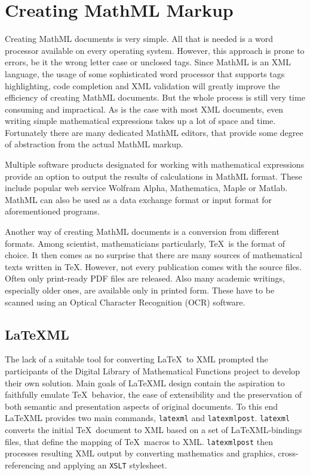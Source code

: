 \documentclass[11pt,oneside,final]{fithesis2}
\begin{document}
\section{Creating MathML Markup}
\label{sec:create-mathml}
Creating MathML documents is very simple. All that is needed is a word processor available on every operating system. However, this approach is prone to errors, be it the wrong letter case or unclosed tags. Since MathML is an XML language, the usage of some sophisticated word processor that supports tags highlighting, code completion and XML validation will greatly improve the efficiency of creating MathML documents. But the whole process is still very time consuming and impractical. As is the case with most XML documents, even writing simple mathematical expressions takes up a lot of space and time. Fortunately there are many dedicated MathML editors, that provide some degree of abstraction from the actual MathML markup.

Multiple software products designated for working with mathematical expressions provide an option to output the results of calculations in MathML format. These include popular web service Wolfram Alpha, Mathematica, Maple or Matlab. MathML can also be used as a data exchange format or input format for aforementioned programs.

Another way of creating MathML documents is a conversion from different formats. Among scientist, mathematicians particularly, \TeX\ is the format of choice. It then comes as no surprise that there are many sources of mathematical texts written in \TeX. However, not every publication comes with the source files. Often only print-ready PDF files are released\cite{baker2011towards}. Also many academic writings, especially older ones, are available only in printed form. These have to be scanned using an Optical Character Recognition (OCR) software. 

\subsection{\LaTeX ML}
The lack of a suitable tool for converting \LaTeX\ to XML prompted the participants of the Digital Library of Mathematical Functions project to develop their own solution. Main goals of \LaTeX ML\cite{latexml:miller2013} design contain the aspiration to faithfully emulate \TeX\ behavior, the ease of extensibility and the preservation of both semantic and presentation aspects of original documents. To this end \LaTeX ML provides two main commands, \texttt{latexml} and \texttt{latexmlpost}. \texttt{latexml} converts the initial \TeX\ document to XML based on a set of \LaTeX ML-bindings files, that define the mapping of \TeX\ macros to XML. \texttt{latexmlpost} then processes resulting XML output by converting mathematics
and graphics, cross-referencing and applying an \texttt{XSLT} stylesheet. 
\end{document}
